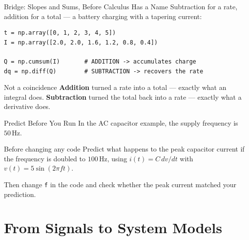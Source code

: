 \documentclass[9pt,aspectratio=169,xcolor=table]{beamer}
\begin{document}
\begin{frame}[fragile]{Bridge: Slopes and Sums, Before Calculus Has a Name}
    \leavevmode
    \small
    Subtraction for a rate, addition for a total --- a battery charging
    with a tapering current:

\begin{lstlisting}
t = np.array([0, 1, 2, 3, 4, 5])
I = np.array([2.0, 2.0, 1.6, 1.2, 0.8, 0.4])

Q = np.cumsum(I)       # ADDITION -> accumulates charge
dq = np.diff(Q)        # SUBTRACTION -> recovers the rate
\end{lstlisting}

    \begin{alertblock}{Not a coincidence}
        \textbf{Addition} turned a rate into a total --- exactly what
        an \alert{integral} does. \textbf{Subtraction} turned the total
        back into a rate --- exactly what a \alert{derivative} does.
    \end{alertblock}
\end{frame}

\begin{frame}{Predict Before You Run}
    \leavevmode
    In the AC capacitor example, the supply frequency is
    $50\,\text{Hz}$.

    \vspace{3mm}
    \begin{block}{Before changing any code}
        Predict what happens to the \alert{peak capacitor current} if
        the frequency is doubled to $100\,\text{Hz}$, using
        $i(t)=C\,dv/dt$ with $v(t)=5\sin(2\pi f t)$.
    \end{block}

    \vspace{3mm}
    Then change \texttt{f} in the code and check whether the peak
    current matched your prediction.
\end{frame}

\section{From Signals to System Models}
\end{document}
